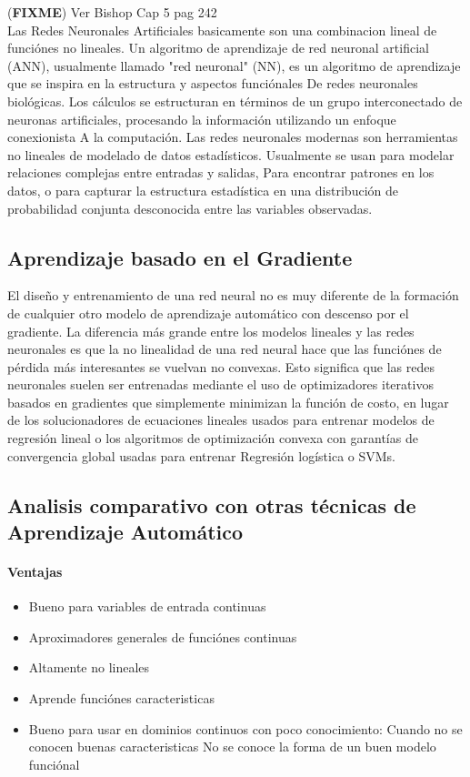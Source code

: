 \documentclass[a4paper,11pt,spanish]{book}
\newcommand*{\FIXME}[1]{{(\textbf{FIXME}) {#1}}}
\begin{document}
 \fi
      \FIXME{Ver Bishop Cap 5 pag 242}\\
      Las Redes Neuronales Artificiales basicamente son una combinacion lineal de funciónes no lineales.
      Un algoritmo de aprendizaje de red neuronal artificial (ANN), usualmente llamado "red neuronal" (NN), es un algoritmo de aprendizaje que se inspira en la estructura y aspectos funciónales
      De redes neuronales biológicas. Los cálculos se estructuran en términos de un grupo interconectado de neuronas artificiales, procesando la información utilizando un enfoque conexionista
      A la computación. Las redes neuronales modernas son herramientas no lineales de modelado de datos estadísticos. Usualmente se usan para modelar relaciones complejas entre entradas y salidas,
      Para encontrar patrones en los datos, o para capturar la estructura estadística en una distribución de probabilidad conjunta desconocida entre las variables observadas.
      
      \subsection{Aprendizaje basado en el Gradiente}
	El diseño y entrenamiento de una red neural no es muy diferente de la formación de cualquier otro modelo de aprendizaje automático con descenso por el gradiente.
	La diferencia más grande entre los modelos lineales y las redes neuronales es que la no linealidad de una red neural hace que las funciónes de pérdida 
	más interesantes se vuelvan no convexas. Esto significa que las redes neuronales suelen ser entrenadas mediante el uso de optimizadores iterativos basados ​​en gradientes 
	que simplemente minimizan la función de costo, en lugar de los solucionadores de ecuaciones lineales usados ​​para entrenar modelos de regresión lineal o los algoritmos de optimización 
	convexa con garantías de convergencia global usadas para entrenar Regresión logística o SVMs.
      
      \subsection{Analisis comparativo con otras técnicas de Aprendizaje Automático}
	\paragraph {Ventajas}
	  \begin{itemize}
	    \item Bueno para variables de entrada continuas
	    \item Aproximadores generales de funciónes continuas
	    \item Altamente no lineales
	    \item Aprende funciónes caracteristicas
	    \item Bueno para usar en dominios continuos con poco conocimiento:
	      \subitem Cuando no se conocen buenas caracteristicas
	      \subitem No se conoce la forma de un buen modelo funciónal
	  \end{itemize}
\end{document}
